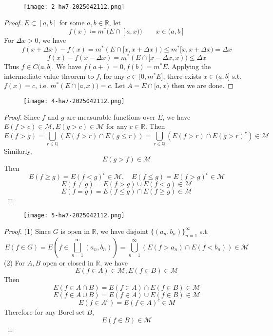 \begin{exercise}
\begin{figure}[H]
\centering
\texttt{[image: 2-hw7-2025042112.png]}
\label{}
\end{figure}
\end{exercise}
\begin{proof}
$E\subset[a,b]$ for some $a, b\in \mathbb{R}$, let
\[
f(x)\coloneqq m^{*}(E\cap[a,x))\qquad x\in(a,b]
\]
For $\Delta x>0$, we have
\[
f(x+\Delta x)-f(x)=m^{*}(E\cap[x,x+\Delta x))\leq m^{*}[x,x+\Delta x)=\Delta x
\]
\[
f(x)-f(x-\Delta x)=m^{*}(E\cap[x-\Delta x,x))\leq \Delta x
\]
Thus $f\in C(a,b]$. We have $f(a+)=0,f(b)=m^*E$. Applying the intermediate value theorem to $f$, for any $c\in (0,m^{*}E]$, there exists $x\in(a,b]$ s.t. $f(x)=c$, i.e.  $m^{*}(E\cap[a,x))=c$. Let $A=E\cap[a,x)$ then we are done.
\end{proof}

\begin{exercise}
\begin{figure}[H]
\centering
\texttt{[image: 4-hw7-2025042112.png]}
\label{}
\end{figure}
\end{exercise}
\begin{proof}
Since $f$ and $g$ are measurable functions over $E$, we have $E (f>c)\in \mathcal{M}, E (g>c)\in \mathcal{M}$ for any $c\in \mathbb{R}$. Then
\[
E(f>g)=\bigcup_{r\in \mathbb{Q}}(E(f>r)\cap E(g\leq r))=\bigcup_{r\in \mathbb{Q}}(E(f>r)\cap E(g>r)^{c})\in \mathcal{M}
\]
Similarly,
\[
E(g>f)\in \mathcal{M}
\]
Then
\[
E(f\geq g)=E(f<g)^{c}\in \mathcal{M},\quad E(f\leq g)=E(f>g)^{c}\in \mathcal{M}
\]
\[
E(f\neq g)=E(f>g)\cup E(f<g)\in \mathcal{M}
\]
\[
E(f=g)=E(f\leq g)\cap E(f\geq g)\in \mathcal{M}
\]
\end{proof}

\begin{exercise}
\begin{figure}[H]
\centering
\texttt{[image: 5-hw7-2025042112.png]}
\label{}
\end{figure}
\end{exercise}
\begin{proof}
(1) Since $G$ is open in $\mathbb{R}$, we have disjoint $\{ (a_n,b_n) \}_{n=1}^{\infty }$ s.t.
\[
E(f\in G)=E\left( f\in\bigsqcup_{n=1}^{\infty}(a_n,b_n) \right)=\bigcup_{n=1}^{\infty} (E(f>a_n)\cap E(f<b_n))\in \mathcal{M}
\]
(2) For $A,B$ open or closed in $\mathbb{R}$, we have
\[
E(f\in A)\in \mathcal{M}, E(f\in B)\in \mathcal{M}
\]
Then
\[
E(f\in A\cap B)=E(f\in A)\cap E(f\in B)\in \mathcal{M}
\]
\[
E(f\in A\cup B)=E(f\in A)\cup E(f\in B)\in \mathcal{M}
\]
\[
E(f\in A^{c})=E(f\in A)^{c}\in M
\]
Therefore for any Borel set $B$,
\[
E(f\in B)\in \mathcal{M}
\]
\end{proof}

